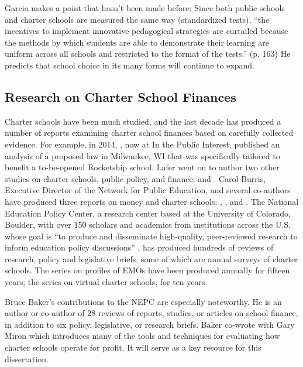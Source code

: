 Garcia makes a point that hasn't been made before: Since both public schools and charter schools are measured the same way (standardized tests), ``the incentives to implement innovative pedagogical strategies are curtailed because the methods by which students are able to demonstrate their learning are uniform across all schools and restricted to the format of the tests.'' (p. 163) He predicts that school choice in its many forms will continue to expand. %

\subsection{Research on Charter School Finances}\label{sec:rese-chart-scho}\indent

Charter schools have been much studied, and the last decade has produced a number of reports examining charter school finances based on carefully collected evidence. For example, in 2014, \textcite{Lafer2014}, now at In the  Public Interest, published an analysis of a proposed law in Milwaukee, WI \parencite{Lafer2014} that was specifically tailored to benefit a to-be-opened Rocketship school. Lafer went on to author two other studies on charter schools, public policy, and finance:  \parencite{Lafer2017} and  \parencite{Lafer2018}. Carol Burris, Executive Director of the Network for Public Education, and several co-authors have produced three reports on money and charter schools: \textcite{Burris.Pfleger2020}, \textcite{Burris.Bryant2020}, and \textcite{Burris.Cimarusti2021}. The National Education Policy Center, a research center based at the University of Colorado, Boulder, with over 150 scholars and academics from institutions across the U.S. whose goal is ``to produce and disseminate high-quality, peer-reviewed research to inform education policy discussions'' \parencite{NEPC2021}, has produced hundreds of reviews of research, policy and legislative briefs, some of which are annual surveys of charter schools. The series on profiles of EMOs have been produced annually for fifteen years; the series on virtual charter schools, for ten years.

Bruce Baker's contributions to the NEPC are especially noteworthy. He is an author or co-author of 28 reviews of reports, studies, or articles on school finance, in addition to six policy, legislative, or research briefs. Baker co-wrote with Gary Miron  \parencite{Baker.Miron2015} which introduces many of the tools and techniques for evaluating how charter schools operate for profit. It will serve as a key resource for this dissertation.

